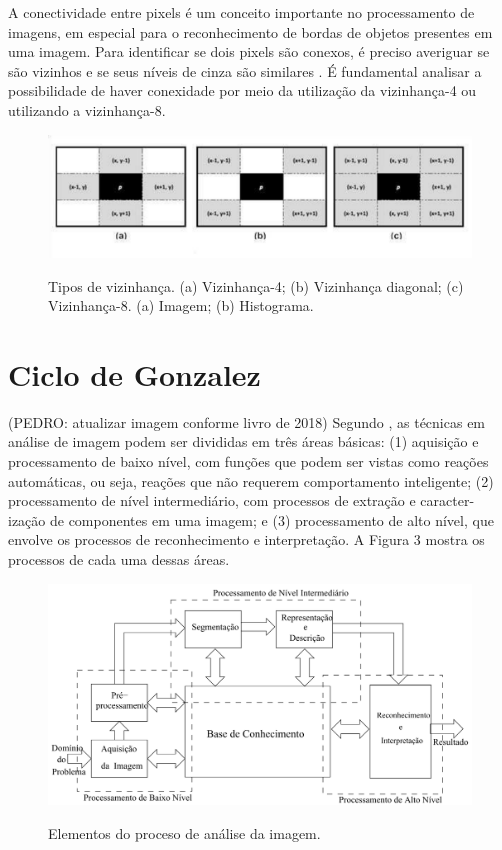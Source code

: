 A conectividade entre pixels é um conceito importante no processamento de imagens, em especial para o reconhecimento de bordas de objetos presentes em uma imagem. Para identificar se dois pixels são conexos, é preciso averiguar se são vizinhos e se seus níveis de cinza são similares . É fundamental analisar a possibilidade de haver conexidade por meio da utilização da vizinhança-4 ou utilizando a vizinhança-8.

 \begin{figure}[htb]
	\centering
	\includegraphics[width=1.0\textwidth]{Imagens/imagem3} %
	\caption[Texto que vai aparecer na lista de fig.]{Tipos de vizinhança. (a) Vizinhança-4; (b) Vizinhança diagonal; (c) Vizinhança-8.  (a) Imagem; (b) Histograma.}
	\label{fig:tux_laplace}
\end{figure}



\section{Ciclo de Gonzalez}
(PEDRO: atualizar imagem conforme livro de 2018)
Segundo , as técnicas em análise de imagem podem ser divididas em três áreas básicas: (1) aquisição e processamento de baixo nível, com funções que podem ser vistas como reações automáticas, ou seja, reações que não requerem comportamento inteligente; (2) processamento de nível intermediário, com processos de extração e caracter- ização de componentes em uma imagem; e (3) processamento de alto nível, que envolve os processos de reconhecimento e interpretação. A Figura 3 mostra os processos de cada uma dessas áreas.

 \begin{figure}[htb]
	\centering
	\includegraphics[width=1.0\textwidth]{Imagens/imagem5} %
	\caption[Elementos do processo de análise de imagem.]{Elementos do proceso de análise da imagem. }
	\label{fig:tux_laplace}
\end{figure}

